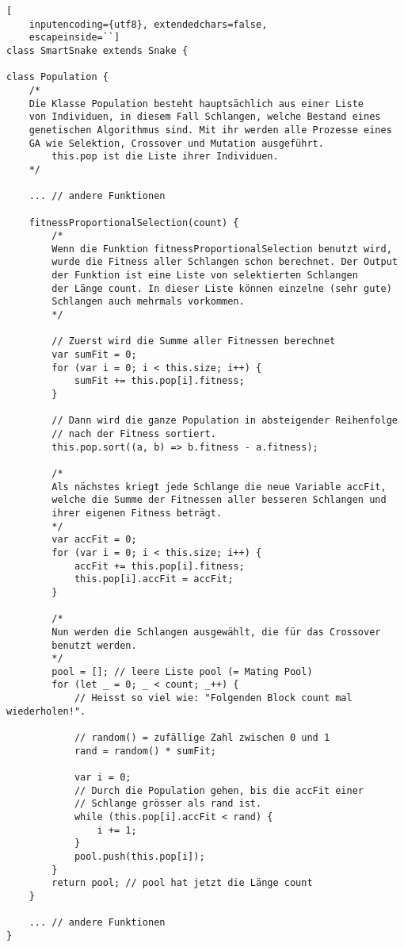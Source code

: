 \documentclass[10pt,a4paper,ngerman,english]{article}
\begin{document}
\begin{lstlisting}[
    inputencoding={utf8}, extendedchars=false,  
    escapeinside=``]
class SmartSnake extends Snake {

class Population {
    /*
    Die Klasse Population besteht hauptsächlich aus einer Liste
    von Individuen, in diesem Fall Schlangen, welche Bestand eines 
    genetischen Algorithmus sind. Mit ihr werden alle Prozesse eines 
    GA wie Selektion, Crossover und Mutation ausgeführt.
        this.pop ist die Liste ihrer Individuen.
    */

    ... // andere Funktionen

    fitnessProportionalSelection(count) {
        /* 
        Wenn die Funktion fitnessProportionalSelection benutzt wird, 
        wurde die Fitness aller Schlangen schon berechnet. Der Output
        der Funktion ist eine Liste von selektierten Schlangen 
        der Länge count. In dieser Liste können einzelne (sehr gute) 
        Schlangen auch mehrmals vorkommen.
        */

        // Zuerst wird die Summe aller Fitnessen berechnet
        var sumFit = 0;
        for (var i = 0; i < this.size; i++) {
            sumFit += this.pop[i].fitness;
        }

        // Dann wird die ganze Population in absteigender Reihenfolge 
        // nach der Fitness sortiert.
        this.pop.sort((a, b) => b.fitness - a.fitness);

        /*
        Als nächstes kriegt jede Schlange die neue Variable accFit,
        welche die Summe der Fitnessen aller besseren Schlangen und
        ihrer eigenen Fitness beträgt.
        */
        var accFit = 0;
        for (var i = 0; i < this.size; i++) {
            accFit += this.pop[i].fitness;
            this.pop[i].accFit = accFit;
        }

        /*
        Nun werden die Schlangen ausgewählt, die für das Crossover 
        benutzt werden.
        */
        pool = []; // leere Liste pool (= Mating Pool)
        for (let _ = 0; _ < count; _++) { 
            // Heisst so viel wie: "Folgenden Block count mal wiederholen!".

            // random() = zufällige Zahl zwischen 0 und 1
            rand = random() * sumFit; 
            
            var i = 0;
            // Durch die Population gehen, bis die accFit einer 
            // Schlange grösser als rand ist.
            while (this.pop[i].accFit < rand) { 
                i += 1;
            }
            pool.push(this.pop[i]);
        }
        return pool; // pool hat jetzt die Länge count
    }

    ... // andere Funktionen
}

\end{lstlisting}
\end{document}
